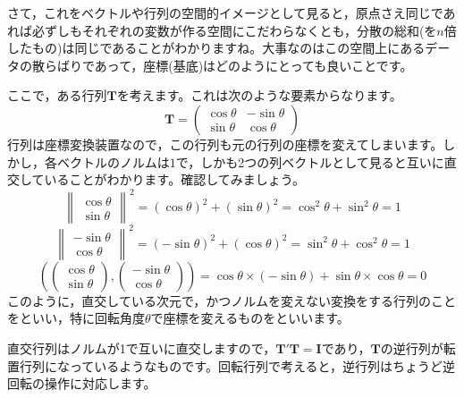 \documentclass{ltjsbook}
\begin{document}
さて，これをベクトルや行列の空間的イメージとして見ると，原点さえ同じであれば必ずしもそれぞれの変数が作る空間にこだわらなくとも，分散の総和(を$n$倍したもの)は同じであることがわかりますね。大事なのはこの空間上にあるデータの散らばりであって，座標(基底)はどのようにとっても良いことです。

ここで，ある行列$\bm{T}$を考えます。これは次のような要素からなります。
\[ \bm{T} = \begin{pmatrix} \cos \theta & -\sin \theta \\ \sin\theta & \cos \theta \end{pmatrix} \]
行列は座標変換装置なので，この行列も元の行列の座標を変えてしまいます。しかし，各ベクトルのノルムは$1$で，しかも2つの列ベクトルとして見ると互いに直交していることがわかります。確認してみましょう。
\[ \begin{Vmatrix}\cos \theta \\\sin \theta \end{Vmatrix}^2 =
	(\cos\theta)^2+(\sin\theta)^2 =\cos^2\theta +\sin^2\theta = 1\]
\[ \begin{Vmatrix}-\sin \theta \\\cos \theta \end{Vmatrix}^2 =
	(-\sin\theta)^2+(\cos\theta)^2 =\sin^2\theta +\cos^2\theta = 1\]
\[ \left(\begin{pmatrix}\cos\theta\\\sin\theta\end{pmatrix},\begin{pmatrix}-\sin\theta\\\cos \theta\end{pmatrix}\right) = \cos\theta \times (-\sin \theta) +\sin \theta\times \cos \theta = 0 \]
このように，直交している次元で，かつノルムを変えない変換をする行列のことをといい，特に回転角度$\theta$で座標を変えるものをといいます。

直交行列はノルムが1で互いに直交しますので，$\bm{T}'\bm{T}=\bm{I}$であり，$\bm{T}$の逆行列が転置行列になっているようなものです。回転行列で考えると，逆行列はちょうど逆回転の操作に対応します。
\end{document}
